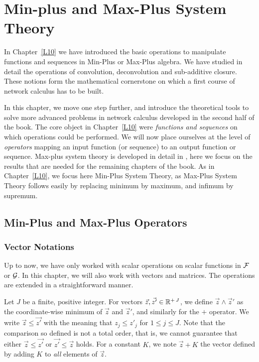 \chapter{Min-plus and Max-Plus System Theory} 

In Chapter~\ref{L10} we have introduced the basic operations to
manipulate functions and sequences in Min-Plus or Max-Plus
algebra.  We have studied in detail the operations of convolution,
deconvolution and sub-additive closure. These notions form the
mathematical cornerstone on which a first course of network
calculus has to be built.

In this chapter, we move one step further, and introduce the
theoretical tools to solve more advanced problems in network
calculus developed in the second half of the book. The core object
in Chapter~\ref{L10} were {\em functions and sequences} on which
operations could be performed. We will now place ourselves at the
level of {\em operators} mapping an input function (or sequence)
to an output function or sequence. Max-plus system theory is
developed in detail in \cite{maxPlus}, here we focus on the
results that are needed for the remaining chapters of the book. As
in Chapter~\ref{L10}, we focus here Min-Plus System Theory, as
Max-Plus System Theory follows easily by replacing minimum by
maximum, and infimum by supremum.

\section{Min-Plus and Max-Plus Operators}

\subsection{Vector Notations}

Up to now, we have only worked with scalar operations on scalar functions in $\mathcal F$ or $\mathcal G$. In this chapter, we will also work with vectors and matrices. The operations are extended in a straightforward manner.

Let $J$ be a finite, positive integer. For vectors $\vec{z},
\vec{z'} \in \mathbb{R}^{+ \, J}$, we define $\vec{z} \wedge \vec{z}'$
as the coordinate-wise minimum of $\vec{z}$ and $\vec{z}'$, and
similarly for the $+$ operator.  We write $\vec{z} \leq \vec{z'}$
with the meaning that $z_{j} \leq z'_{j}$ for $1 \leq j \leq J$.
Note that the comparison so defined is not a total order, that is,
we cannot guarantee that either $\vec{z} \leq \vec{z'}$ or
$\vec{z'} \leq \vec{z}$ holds.  For a constant $K$, we note
$\vec{z} + K $ the vector defined by adding $K$ to \emph{all}
elements of $\vec{z}$.

